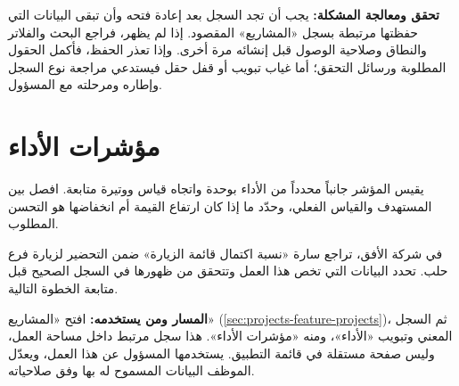 \textbf{تحقق ومعالجة المشكلة:} يجب أن تجد السجل بعد إعادة فتحه وأن تبقى البيانات التي حفظتها مرتبطة بسجل «المشاريع» المقصود. إذا لم يظهر، فراجع البحث والفلاتر والنطاق وصلاحية الوصول قبل إنشائه مرة أخرى. وإذا تعذر الحفظ، فأكمل الحقول المطلوبة ورسائل التحقق؛ أما غياب تبويب أو قفل حقل فيستدعي مراجعة نوع السجل وإطاره ومرحلته مع المسؤول.

\clearpage
\section{مؤشرات الأداء}
\label{sec:projects-feature-performance-indicators}

يقيس المؤشر جانباً محدداً من الأداء بوحدة واتجاه قياس ووتيرة متابعة. افصل بين المستهدف والقياس الفعلي، وحدّد ما إذا كان ارتفاع القيمة أم انخفاضها هو التحسن المطلوب.

\begin{rcnote}
في شركة الأفق، تراجع سارة «نسبة اكتمال قائمة الزيارة» ضمن التحضير لزيارة فرع حلب. تحدد البيانات التي تخص هذا العمل وتتحقق من ظهورها في السجل الصحيح قبل متابعة الخطوة التالية.
\end{rcnote}

\textbf{المسار ومن يستخدمه:} افتح «المشاريع» (\ref{sec:projects-feature-projects})، ثم السجل المعني وتبويب «الأداء»، ومنه «مؤشرات الأداء». هذا سجل مرتبط داخل مساحة العمل، وليس صفحة مستقلة في قائمة التطبيق. يستخدمها المسؤول عن هذا العمل، ويعدّل الموظف البيانات المسموح له بها وفق صلاحياته.

